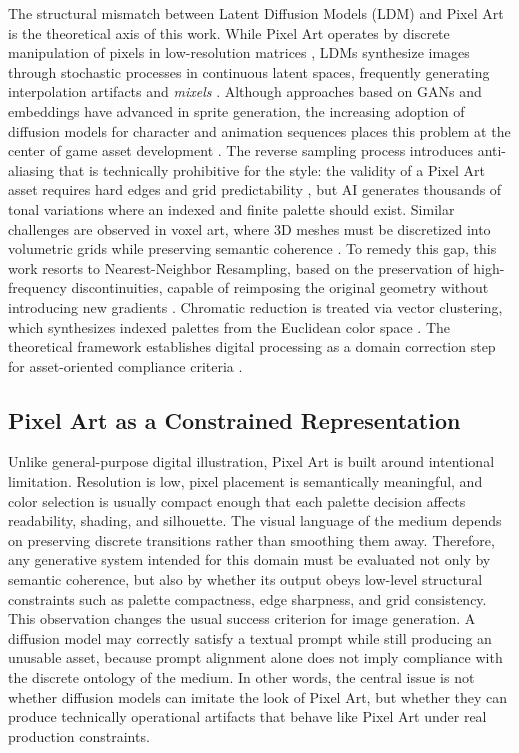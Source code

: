 \documentclass[runningheads]{llncs}
\begin{document}
The structural mismatch between Latent Diffusion Models (LDM) and Pixel Art is the theoretical axis of this work. While Pixel Art operates by discrete manipulation of pixels in low-resolution matrices \cite{chen2025gametilenet}, LDMs synthesize images through stochastic processes in continuous latent spaces, frequently generating interpolation artifacts and \textit{mixels} \cite{chen2023pixart}. Although approaches based on GANs \cite{coutinho2024pixel,kim2023game} and embeddings \cite{merino2023five} have advanced in sprite generation, the increasing adoption of diffusion models for character and animation sequences places this problem at the center of game asset development \cite{gallotta2025importance,ribeiro2024image,hsieh2025sprite}. The reverse sampling process introduces anti-aliasing that is technically prohibitive for the style: the validity of a Pixel Art asset requires hard edges and grid predictability \cite{mercioni2024innovative}, but AI generates thousands of tonal variations where an indexed and finite palette should exist. Similar challenges are observed in voxel art, where 3D meshes must be discretized into volumetric grids while preserving semantic coherence \cite{huang2026voxify3d}. To remedy this gap, this work resorts to Nearest-Neighbor Resampling, based on the preservation of high-frequency discontinuities, capable of reimposing the original geometry without introducing new gradients \cite{kopf2011,coutinho2024missing}. Chromatic reduction is treated via vector clustering, which synthesizes indexed palettes from the Euclidean color space \cite{coutinho2025imputation}. The theoretical framework establishes digital processing as a domain correction step for asset-oriented compliance criteria \cite{ekpete2023pixelperfect}.

\subsection{Pixel Art as a Constrained Representation}

Unlike general-purpose digital illustration, Pixel Art is built around intentional limitation. Resolution is low, pixel placement is semantically meaningful, and color selection is usually compact enough that each palette decision affects readability, shading, and silhouette. The visual language of the medium depends on preserving discrete transitions rather than smoothing them away. Therefore, any generative system intended for this domain must be evaluated not only by semantic coherence, but also by whether its output obeys low-level structural constraints such as palette compactness, edge sharpness, and grid consistency. This observation changes the usual success criterion for image generation. A diffusion model may correctly satisfy a textual prompt while still producing an unusable asset, because prompt alignment alone does not imply compliance with the discrete ontology of the medium. In other words, the central issue is not whether diffusion models can imitate the look of Pixel Art, but whether they can produce technically operational artifacts that behave like Pixel Art under real production constraints.
\end{document}
